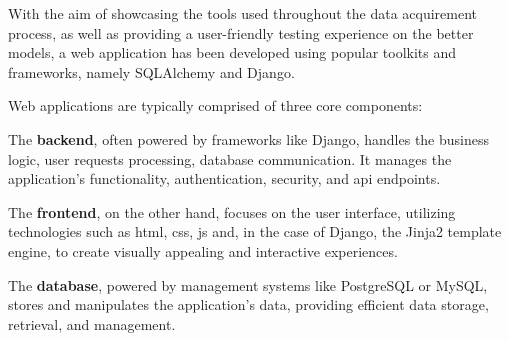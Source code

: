 With the aim of showcasing the tools used throughout the data acquirement process, as well as providing a user-friendly testing experience on the better models, a web application has been developed using popular toolkits and frameworks, namely SQLAlchemy and Django.

Web applications are typically comprised of three core components:
\begin{compactitem}[\textbullet]
    \item The \textbf{backend}, often powered by frameworks like Django, handles the business logic, user requests processing, database communication. It manages the application's functionality, authentication, security, and \acs{api} endpoints. 
    \item The \textbf{frontend}, on the other hand, focuses on the user interface, utilizing technologies such as \acs{html}, \acs{css}, \acl{js} and, in the case of Django, the Jinja2 template engine, to create visually appealing and interactive experiences.
    \item The \textbf{database}, powered by management systems like PostgreSQL or MySQL, stores and manipulates the application's data, providing efficient data storage, retrieval, and management.
\end{compactitem}
